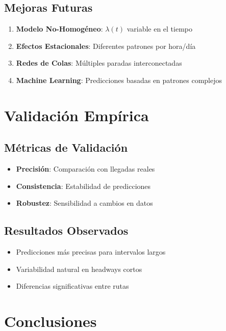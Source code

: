 \documentclass[12pt,a4paper]{article}
\begin{document}
\subsection{Mejoras Futuras}

\begin{enumerate}
    \item \textbf{Modelo No-Homogéneo}: $\lambda(t)$ variable en el tiempo
    \item \textbf{Efectos Estacionales}: Diferentes patrones por hora/día
    \item \textbf{Redes de Colas}: Múltiples paradas interconectadas
    \item \textbf{Machine Learning}: Predicciones basadas en patrones complejos
\end{enumerate}

\section{Validación Empírica}

\subsection{Métricas de Validación}

\begin{itemize}
    \item \textbf{Precisión}: Comparación con llegadas reales
    \item \textbf{Consistencia}: Estabilidad de predicciones
    \item \textbf{Robustez}: Sensibilidad a cambios en datos
\end{itemize}

\subsection{Resultados Observados}

\begin{itemize}
    \item Predicciones más precisas para intervalos largos
    \item Variabilidad natural en headways cortos
    \item Diferencias significativas entre rutas
\end{itemize}

\section{Conclusiones}
\end{document}
